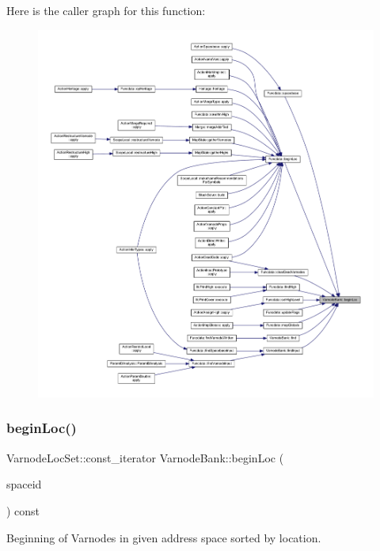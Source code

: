 Here is the caller graph for this function\+:
\nopagebreak
\begin{figure}[H]
\begin{center}
\leavevmode
\includegraphics[width=350pt]{class_varnode_bank_adbb6ea3ddaec68864cb408ad45eeb66d_icgraph}
\end{center}
\end{figure}
\mbox{\label{class_varnode_bank_a58e2a7364cd253c9dc935233269a9bb2}} 
\subsubsection{\texorpdfstring{beginLoc()}{beginLoc()}\hspace{0.1cm}{\footnotesize\ttfamily [2/6]}}
{\footnotesize\ttfamily Varnode\+Loc\+Set\+::const\+\_\+iterator Varnode\+Bank\+::begin\+Loc (\begin{DoxyParamCaption}\item[{\mbox{\hyperlink{class_addr_space}{Addr\+Space}} $\ast$}]{spaceid }\end{DoxyParamCaption}) const}



Beginning of Varnodes in given address space sorted by location. 


